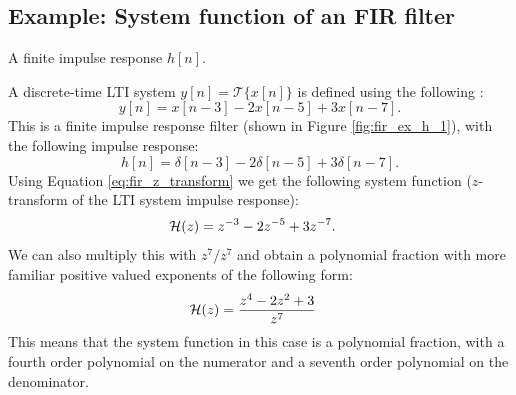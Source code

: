 \subsection{Example: System function of an FIR filter}

\begin{marginfigure}
  \begin{center}
  \end{center}
  \caption{A finite impulse response $h[n]$.}
  \label{fig:fir_ex_h_1}
\end{marginfigure}

A discrete-time LTI system $y[n]=\mathcal{T}\{x[n]\}$ is defined using the following \emph{}:
\begin{equation}
  y[n] = x[n-3] - 2 x[n-5] + 3 x[n-7].
\end{equation}
This is a finite impulse response filter (shown in Figure \ref{fig:fir_ex_h_1}), with the following impulse response:
\begin{equation}
  h[n]=\delta[n-3]-2\delta[n-5]+3\delta[n-7].
\end{equation}
Using Equation \ref{eq:fir_z_transform} we get the following system function ($z$-transform of the LTI system impulse response):
\begin{align}
  \mathcal{H}(z) & = z^{-3} - 2 z^{-5} + 3 z^{-7}.
\end{align}
We can also multiply this with $z^{7}/z^{7}$ and obtain a polynomial
fraction with more familiar positive valued exponents of the following
form:
\begin{align}
  \mathcal{H}(z) & = \frac{z^{4} - 2 z^{2} + 3}{z^{7}}
\end{align}
This means that the system function in this case is a polynomial
fraction, with a fourth order polynomial on the numerator and a seventh order polynomial on the denominator.

